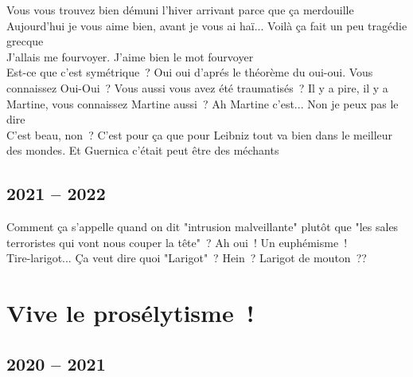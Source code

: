 \documentclass[french, a4paper, openany]{book}
\begin{document}
	\noindent \og Vous vous trouvez bien démuni l'hiver arrivant parce que ça merdouille \fg \\
	\og Aujourd'hui je vous aime bien, avant je vous ai haï... Voilà ça fait un peu tragédie grecque \fg \\
	\og J'allais me fourvoyer. J'aime bien le mot fourvoyer \fg \\
	\og Est-ce que c'est symétrique~? Oui oui d'aprés le théorème du oui-oui. Vous connaissez Oui-Oui~? Vous aussi vous avez été traumatisés~? Il y a pire, il y a Martine, vous connaissez Martine aussi~? Ah Martine c'est... Non je peux pas le dire \fg \\
	\og C'est beau, non~? C'est pour ça que pour Leibniz tout va bien dans le meilleur des mondes. Et Guernica c'était peut être des méchants \fg \\	

	\subsection*{2021 -- 2022}

	\noindent \og Comment ça s'appelle quand on dit "intrusion malveillante" plutôt que "les sales terroristes qui vont nous couper la tête"~? Ah oui~! Un euphémisme~! \fg \\
	\og Tire-larigot... Ça veut dire quoi "Larigot"~? Hein~? Larigot de mouton~?? \fg \\

\section*{Vive le prosélytisme~!} 

	\subsection*{2020 -- 2021}
 
\end{document}
